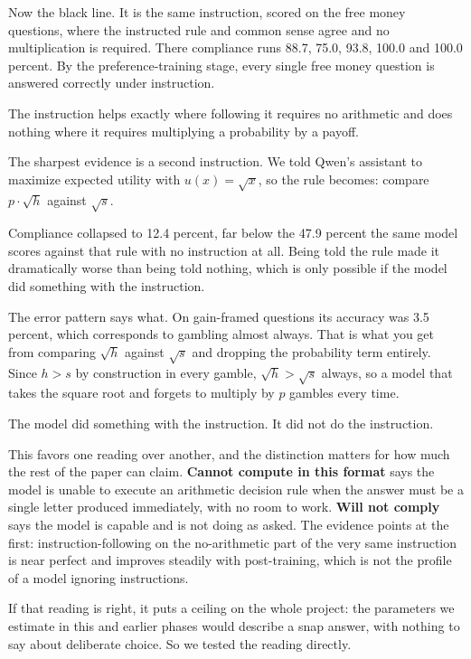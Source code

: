 \documentclass[11pt]{article}
\newcommand{\term}[1]{\textbf{\color{purpledk}#1}}
\begin{document}
Now the black line. It is the same instruction, scored on the free money questions, where the
instructed rule and common sense agree and no multiplication is required. There compliance runs
88.7, 75.0, 93.8, 100.0 and 100.0 percent. By the preference-training stage, every single free
money question is answered correctly under instruction.

The instruction helps exactly where following it requires no arithmetic and does nothing where it
requires multiplying a probability by a payoff.

\begin{workbox}
The sharpest evidence is a second instruction. We told Qwen's assistant to maximize expected
utility with $u(x) = \sqrt{x}$, so the rule becomes: compare $p \cdot \sqrt{h}$ against
$\sqrt{s}$.

Compliance collapsed to 12.4 percent, far below the 47.9 percent the same model scores against
that rule with no instruction at all. Being told the rule made it dramatically worse than being
told nothing, which is only possible if the model did something with the instruction.

The error pattern says what. On gain-framed questions its accuracy was 3.5 percent, which
corresponds to gambling almost always. That is what you get from comparing $\sqrt{h}$ against
$\sqrt{s}$ and dropping the probability term entirely. Since $h > s$ by construction in every
gamble, $\sqrt{h} > \sqrt{s}$ always, so a model that takes the square root and forgets to
multiply by $p$ gambles every time.

The model did something with the instruction. It did not do the instruction.
\end{workbox}

This favors one reading over another, and the distinction matters for how much the rest of the
paper can claim. \term{Cannot compute in this format} says the model is unable to execute an
arithmetic decision rule when the answer must be a single letter produced immediately, with no
room to work. \term{Will not comply} says the model is capable and is not doing as asked. The
evidence points at the first: instruction-following on the no-arithmetic part of the very same
instruction is near perfect and improves steadily with post-training, which is not the profile of
a model ignoring instructions.

If that reading is right, it puts a ceiling on the whole project: the parameters we estimate in
this and earlier phases would describe a snap answer, with nothing to say about deliberate choice. So
we tested the reading directly.
\end{document}
